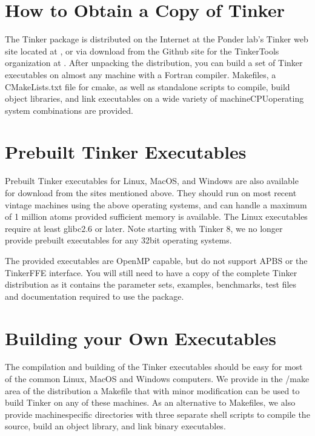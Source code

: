 \documentclass[letterpaper,11pt,english]{sphinxmanual}
\begin{document}
\section{How to Obtain a Copy of Tinker}
\label{\detokenize{text/installation:how-to-obtain-a-copy-of-tinker}}
The Tinker package is distributed on the Internet at the Ponder lab’s Tinker web site located at , or via download from the Github site for the TinkerTools organization at . After unpacking the distribution, you can build a set of Tinker executables on almost any machine with a Fortran compiler. Makefiles, a CMakeLists.txt file for cmake, as well as standalone scripts to compile, build object libraries, and link executables on a wide variety of machine\sphinxhyphen{}CPU\sphinxhyphen{}operating system combinations are provided.


\section{Prebuilt Tinker Executables}
\label{\detokenize{text/installation:prebuilt-tinker-executables}}
Pre\sphinxhyphen{}built Tinker executables for Linux, MacOS, and Windows are also available for download from the sites mentioned above. They should run on most recent vintage machines using the above operating systems, and can handle a maximum of 1 million atoms provided sufficient memory is available. The Linux executables require at least glibc\sphinxhyphen{}2.6 or later. Note starting with Tinker 8, we no longer provide pre\sphinxhyphen{}built executables for any 32\sphinxhyphen{}bit operating systems.

The provided executables are OpenMP capable, but do not support APBS or the Tinker\sphinxhyphen{}FFE interface. You will still need to have a copy of the complete Tinker distribution as it contains the parameter sets, examples, benchmarks, test files and documentation required to use the package.


\section{Building your Own Executables}
\label{\detokenize{text/installation:building-your-own-executables}}
The compilation and building of the Tinker executables should be easy for most of the common Linux, MacOS and Windows computers. We provide in the /make area of the distribution a Makefile that with minor modification can be used to build Tinker on any of these machines. As an alternative to Makefiles, we also provide machine\sphinxhyphen{}specific directories with three separate shell scripts to compile the source, build an object library, and link binary executables.
\end{document}
